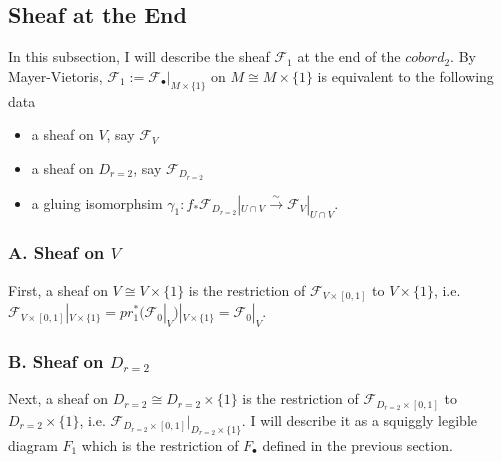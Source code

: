 \subsection*{Sheaf at the End}
In this subsection, I will describe the sheaf $\mathscr{F}_1$ at the end of the $cobord_2$. By Mayer-Vietoris, $\mathscr{F}_1:= \mathscr{F}_\bullet|_{M\times\{1\}}$ on $M \cong M\times\{1\}$ is equivalent to the following data
\begin{itemize}
\item a sheaf on $V$, say $\mathscr{F}_{V}$

\item a sheaf on $D_{r=2}$, say $\mathscr{F}_{D_{r=2}}$

\item a gluing isomorphsim $\gamma_1 : f_*\mathscr{F}_{D_{r=2}}|_{U\cap V} \xrightarrow{\sim} \mathscr{F}_{V}|_{U\cap V}$.
\end{itemize}

\subsubsection{A. Sheaf on $V$}
First, a sheaf on $V\cong V\times\{1\}$ is the restriction of $\mathscr{F}_{V\times [0,1]}$ to $V\times \{1\}$, i.e. $\mathscr{F}_{V\times [0,1]}|_{V\times \{1\}}= pr_1^*(\mathscr{F}_0|_V)|_{V\times \{1\}} = \mathscr{F}_0|_V$.
\subsubsection{B. Sheaf on $D_{r=2}$}
Next, a sheaf on $D_{r=2}\cong D_{r=2}\times \{1\}$ is the restriction of $\mathscr{F}_{D_{r=2}\times [0,1]}$ to $D_{r=2}\times \{1\}$, i.e. $\mathscr{F}_{D_{r=2}\times [0,1]} |_{D_{r=2}\times \{1\}}$. I will describe it as a squiggly legible diagram $F_1$ which is the restriction of $F_\bullet$ defined in the previous section.

